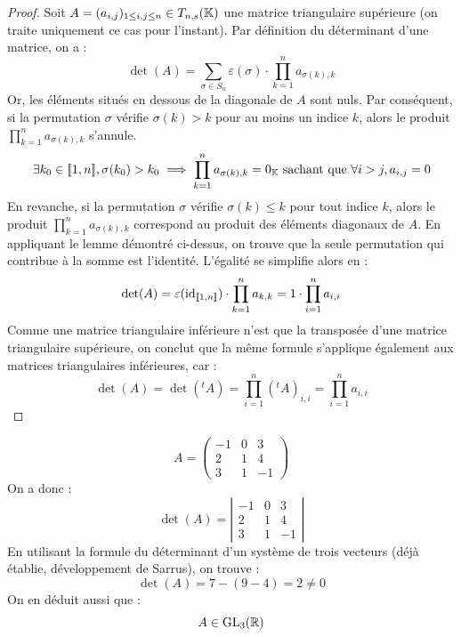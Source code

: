 \documentclass[12pt, a4paper]{report}
\begin{document}
\begin{proof}
    Soit $A = (a_{i,j})_{1 \le i,j \le n} \in T_{n,s}(\mathbb{K})$ une matrice triangulaire supérieure (on traite uniquement ce cas pour l'instant). Par définition du déterminant d'une matrice, on a :
    $$\det(A) = \sum_{\sigma \in S_n} \varepsilon(\sigma) \cdot \prod_{k=1}^{n} a_{\sigma(k), k}$$
    Or, les éléments situés en dessous de la diagonale de $A$ sont nuls. Par conséquent, si la permutation $\sigma$ vérifie $\sigma(k) > k$ pour au moins un indice $k$, alors le produit $\prod_{k=1}^{n} a_{\sigma(k), k}$ s'annule.
    $$\exists k_0 \in [\![1,n]\!], \sigma(k_0) > k_0 \implies \prod_{k=1}^{n} a_{\sigma(k), k} = 0_{\mathbb{K}} \text{ sachant que } \forall i > j, a_{i,j} = 0$$ 
    En revanche, si la permutation $\sigma$ vérifie $\sigma(k) \le k$ pour tout indice $k$, alors le produit $\prod_{k=1}^{n} a_{\sigma(k), k}$ correspond au produit des éléments diagonaux de $A$. 
    En appliquant le lemme démontré ci-dessus, on trouve que la seule permutation qui contribue à la somme est l'identité. L'égalité se simplifie alors en :
    $$\det(A) = \varepsilon(\mathrm{id}_{[\![1,n]\!]}) \cdot \prod_{k=1}^{n} a_{k,k} = 1 \cdot \prod_{i=1}^{n} a_{i,i}$$
    Comme une matrice triangulaire inférieure n'est que la transposée d'une matrice triangulaire supérieure, on conclut que la même formule s'applique également aux matrices triangulaires inférieures, car :
    $$\det(A) = \det(^t A) = \prod_{i=1}^{n} (^t A)_{i,i} = \prod_{i=1}^{n} a_{i,i}$$
\end{proof}

\begin{example}
    $$A = \left(\begin{matrix} -1 & 0 & 3 \\ 2 & 1 & 4 \\ 3 & 1 & -1 \end{matrix}\right)$$
    On a donc :
    $$\det(A) = \left|\begin{matrix} -1 & 0 & 3 \\ 2 & 1 & 4 \\ 3 & 1 & -1 \end{matrix}\right|$$
    En utilisant la formule du déterminant d'un système de trois vecteurs (déjà établie, développement de Sarrus), on trouve :
    $$\det(A) = 7 - (9-4) = 2 \ne 0$$
    On en déduit aussi que :
    $$A \in \mathrm{GL}_3(\mathbb{R})$$
\end{example}
\end{document}
